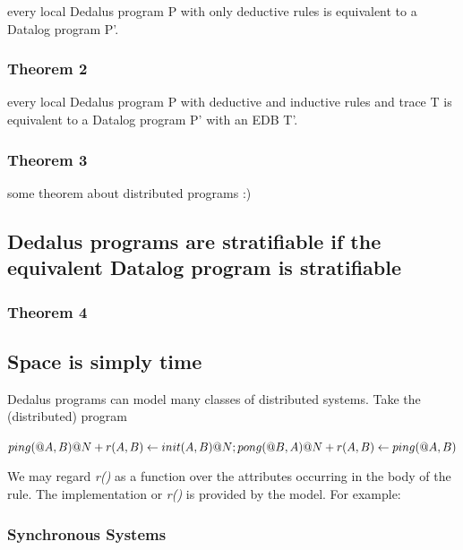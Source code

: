 \documentclass{acm_proc_article-sp-sigmod09}
\begin{document}
\newtheorem{foo}{bar bas bat}
every local Dedalus program P with only deductive rules is equivalent to a Datalog program P'.

\subsubsection{Theorem 2}

every local Dedalus program P with deductive and inductive rules and trace T is equivalent to a Datalog program P' with an EDB T'.

\subsubsection{Theorem 3}

some theorem about distributed programs :)

\subsection{Dedalus programs are stratifiable if the equivalent Datalog program is stratifiable}

\subsubsection{Theorem 4}

\subsection{Space is simply time}



Dedalus programs can model many classes of distributed systems.  Take the (distributed) program

$
ping(@A, B)@N + r(A, B) \leftarrow \\
init(A, B)@N; \\
\\
pong(@B, A)@N + r(A, B) \leftarrow \\
ping(@A, B)
$

We may regard  \emph{r()} as a function over the attributes occurring in the body of the rule.  The implementation or \emph{r()} is provided by
the model.  For example:

\subsubsection{Synchronous Systems}
\end{document}
